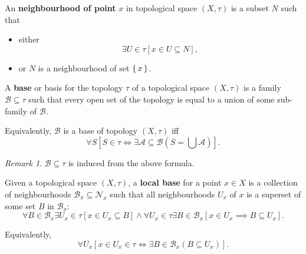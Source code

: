 \documentclass[12pt, letterpaper]{article}
\theoremstyle{definition}
\theoremstyle{remark}
\newtheorem*{rem*}{Remark}
\theoremstyle{definition}
\theoremstyle{plain}
\numberwithin{equation}{section}
\begin{document}
	\begin{def*}
		An \textbf{neighbourhood of point} $x$ in topological space $(X,\tau)$ is a subset $N$ such that
		\begin{itemize}
			\item either 
			\[\exists U\in \tau [x\in U\subseteq N], \]
			\item or $N$ is a neighbourhood of set $\set{x}$.
		\end{itemize}
	\end{def*}

	\begin{def*}[base]
		A \textbf{base} or basis for the topology $\tau$ of a topological space $(X, \tau)$
		is a family $\mathcal{B}\subseteq\tau$ such that every open set of the topology is equal to a union of some sub-family of $\mathcal{B}$.
		
		Equivalently, $\mathcal{B}$ is a base of topology $(X, \tau)$ iff
		\[\forall S [S\in\tau\iff \exists \mathcal{A}\subseteq \mathcal{B} ( S=\bigcup \mathcal{A})].\]
	\end{def*}
	\begin{rem*}
		$\mathcal{B}\subseteq\tau$ is induced from the above formula.
	\end{rem*}

	\begin{def*}
		Given a topological space $(X,\tau)$,
		a \textbf{local base} for a point $x\in X$ is a collection of neighbourhoods $\mathcal{B}_x\subseteq \mathcal{N}_x$ such that
		all neighbourhoods $U_x$ of $x$ is a superset of some set $B$ in $\mathcal{B}_x$:
		\[ \forall B\in \mathcal{B}_x\exists U_x\in\tau[x\in U_x\subseteq B]\land \forall U_x\in\tau\exists B\in\mathcal{B}_x [x\in U_x\implies B\subseteq U_x] .\]
		
		Equivalently,
		\[ \forall U_x [x\in U_x\in\tau \iff \exists B\in\mathcal{B}_x (B\subseteq U_x) ]  .\]
	\end{def*}
\end{document}
